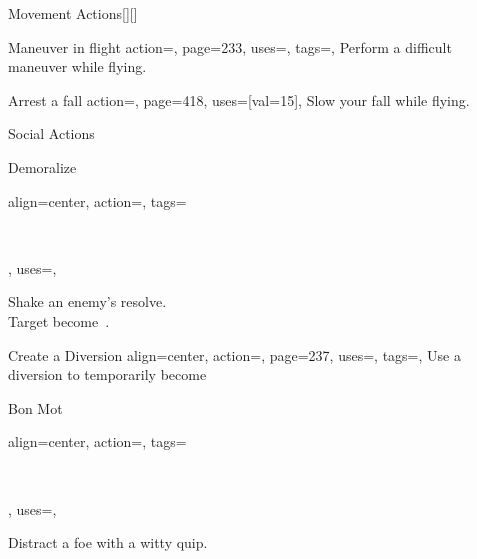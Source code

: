 \begin{PageBack}
\begin{Tables}{\backTableHeight}
\begin{Table}{Movement Actions}[][]
\begin{entry}{Maneuver in flight}{%
                action=,
                page=233,
                uses={\Acrobatics[tags={T}]},
                tags=\Move,
            }
                Perform a difficult maneuver while flying.\hfill {}\quad {}
            \end{entry}
            \begin{entry}{Arrest a fall}{%
                action=,
                page=418,
                uses={[val=15]},
            }
                Slow your fall while flying.
            \end{entry}
        \end{Table}
        \TableSpace
        \begin{Table}{Social Actions}
            \begin{entry}{Demoralize}{%
                align=center,
                action=,
                tags=\parbox{0.52\linewidth}{\raggedleft{}\,\Concentrate\\\Mental\Emotion\Fear},
                uses=\InitimidationWill,
            }
                Shake an enemy's resolve. \Auditory \ \hfill {}\\
                Target become \Frightened\,.\hfill {}
            \end{entry}
            \begin{entry}{Create a Diversion}{%
                align=center,
                action=,
                page=237,
                uses=\DeceptionPerception,
                tags=\Mental,
            }
                Use a diversion to temporarily become \Hidden\hfill{}\\
            \end{entry}
            \begin{entry}{Bon Mot}{%
                align=center,
                action=,
                tags=\parbox{0.5\linewidth}{\raggedleft{}\,\Concentrate\\\Auditory\Linguistic},
                uses={\DiplomacyWill[tags={T}]\Feat},
            }
                Distract a foe with a witty quip. \Emotion\Mental\hfill {}\\

\end{entry}
\end{Table}
\end{Tables}
\end{PageBack}
